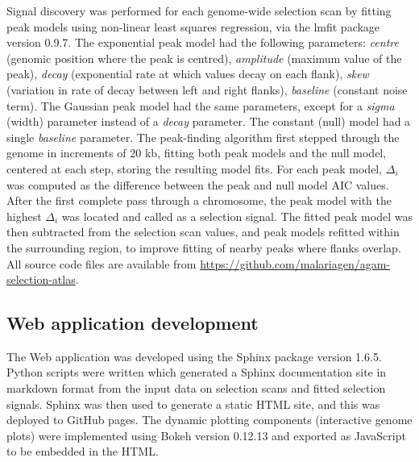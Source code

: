 \documentclass[a4paper,11pt,abstracton,hidelinks]{scrartcl}
\begin{document}
Signal discovery was performed for each genome-wide selection scan by fitting peak models using non-linear least squares regression, via the lmfit package version 0.9.7.
%
The exponential peak model had the following parameters: \textit{centre} (genomic position where the peak is centred), \textit{amplitude} (maximum value of the peak), \textit{decay} (exponential rate at which values decay on each flank), \textit{skew} (variation in rate of decay between left and right flanks), \textit{baseline} (constant noise term).
%
The Gaussian peak model had the same parameters, except for a \textit{sigma} (width) parameter instead of a \textit{decay} parameter.
%
The constant (null) model had a single \textit{baseline} parameter.
%
The peak-finding algorithm first stepped through the genome in increments of 20 kb, fitting both peak models and the null model, centered at each step, storing the resulting model fits.
%
For each peak model, $\Delta_i$ was computed as the difference between the peak and null model AIC values.
%
After the first complete pass through a chromosome, the peak model with the highest $\Delta_i$ was located and called as a selection signal.
%
The fitted peak model was then subtracted from the selection scan values, and peak models refitted within the surrounding region, to improve fitting of nearby peaks where flanks overlap.
%
All source code files are available from \url{https://github.com/malariagen/agam-selection-atlas}.


\subsection{Web application development}\label{subsec:methods-webapp}


The Web application was developed using the Sphinx package version 1.6.5.
%
Python scripts were written which generated a Sphinx documentation site in markdown format from the input data on selection scans and fitted selection signals.
%
Sphinx was then used to generate a static HTML site, and this was deployed to GitHub pages.
%
The dynamic plotting components (interactive genome plots) were implemented using Bokeh version 0.12.13 and exported as JavaScript to be embedded in the HTML.


\printbibliography


\clearpage
\beginsupplement
\end{document}
